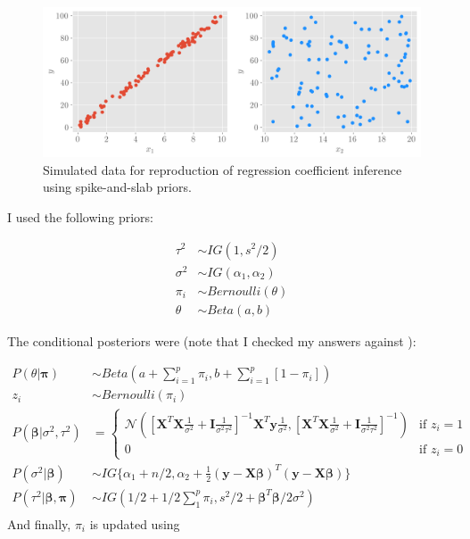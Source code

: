 \documentclass[12pt]{article}
\begin{document}
\begin{figure}[!h]
    \centering
    \includegraphics[scale=.6
    ]{../figures/toydata.png}
    \caption{Simulated data for reproduction of regression coefficient inference using spike-and-slab priors.}
    \label{toydata}
\end{figure}

I used the following priors:

\begin{align*}
    \tau^2 &\sim IG(1, s^2/2)\\
    \sigma^2 &\sim IG(\alpha_1, \alpha_2)\\
    \pi_i &\sim Bernoulli(\theta)\\
    \theta & \sim Beta(a, b)
\end{align*}

The conditional posteriors were (note that I checked my answers against \cite{andrade2020disjunct}):

\begin{align}
    P(\theta|\boldsymbol{\pi}) &\sim Beta(a + \sum_{i=1}^p \pi_i, b + \sum_{i=1}^p [1-\pi_i])\\
    z_i &\sim Bernoulli(\pi_i)\\
    P(\boldsymbol{\beta}|\sigma^2, \tau^2) &= \begin{cases}
     \mathcal{N}\left(\left[\boldsymbol{X}^T\boldsymbol{X} \frac{1}{\sigma^2} + \boldsymbol{I}\frac{1}{\sigma^2\tau^2}\right]^{-1}\boldsymbol{X}^T \boldsymbol{y} \frac{1}{\sigma^2}, \left[\boldsymbol{X}^T\boldsymbol{X} \frac{1}{\sigma^2} + \boldsymbol{I}\frac{1}{\sigma^2\tau^2}\right]^{-1}\right)& \text{if } z_i = 1\\
    0             & \text{if } z_i = 0
\end{cases}\\
P(\sigma^2|\boldsymbol{\beta}) &\sim IG\{\alpha_1 + n/2, \alpha_2 + \frac{1}{2}(\boldsymbol{y}-\boldsymbol{X}\boldsymbol{\beta})^T(\boldsymbol{y}-\boldsymbol{X}\boldsymbol{\beta})\} \\
P(\tau^2|\boldsymbol{\beta}, \boldsymbol{\pi}) &\sim IG(1/2 + 1/2\sum_1^{p}\pi_i, s^2/2 + \boldsymbol{\beta}^T\boldsymbol{\beta}/2\sigma^2)\\
\end{align}
And finally, $\pi_i$ is updated using 
\end{document}
